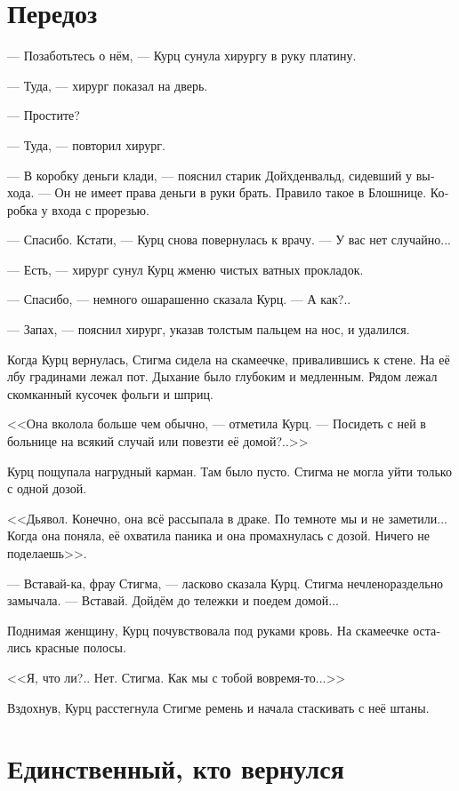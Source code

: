 \documentclass[a4paper,12pt,fleqn]{book}\usepackage{polyglossia}\setdefaultlanguage[babelshorthands=true]{russian}\setotherlanguage{english}\defaultfontfeatures{Ligatures=TeX,Mapping=tex-text}\usepackage{xcolor}\newcommand{\ml}[3]{#2}
\begin{document}
\section{Передоз}

--- Позаботьтесь о нём, --- Курц сунула хирургу в руку платину.

--- Туда, --- хирург показал на дверь.

--- Простите?

--- Туда, --- повторил хирург.

--- В коробку деньги клади, --- пояснил старик Дойхденвальд, сидевший у выхода.
--- Он не имеет права деньги в руки брать.
Правило такое в Блошнице.
Коробка у входа с прорезью.

--- Спасибо.
Кстати, --- Курц снова повернулась к врачу.
--- У вас нет случайно...

--- Есть, --- хирург сунул Курц жменю чистых ватных прокладок.

--- Спасибо, --- немного ошарашенно сказала Курц.
--- А как?..

--- Запах, --- пояснил хирург, указав толстым пальцем на нос, и удалился.

Когда Курц вернулась, Стигма сидела на скамеечке, привалившись к стене.
На её лбу градинами лежал пот.
Дыхание было глубоким и медленным.
Рядом лежал скомканный кусочек фольги и шприц.

<<Она вколола больше чем обычно, --- отметила Курц.
--- Посидеть с ней в больнице на всякий случай или повезти её домой?..>>

Курц пощупала нагрудный карман.
Там было пусто.
Стигма не могла уйти только с одной дозой.

<<Дьявол.
Конечно, она всё рассыпала в драке.
По темноте мы и не заметили...
Когда она поняла, её охватила паника и она промахнулась с дозой.
Ничего не поделаешь>>.

--- Вставай-ка, фрау Стигма, --- ласково сказала Курц.
Стигма нечленораздельно замычала.
--- Вставай.
Дойдём до тележки и поедем домой...

Поднимая женщину, Курц почувствовала под руками кровь.
На скамеечке остались красные полосы.

<<Я, что ли?..
Нет.
Стигма.
Как мы с тобой вовремя-то...>>

Вздохнув, Курц расстегнула Стигме ремень и начала стаскивать с неё штаны.

\section{Единственный, кто вернулся}
\end{document}

